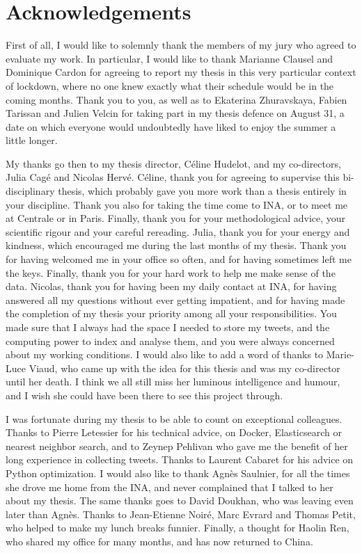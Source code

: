 \chapter*{Acknowledgements}

First of all, I would like to solemnly thank the members of my jury who agreed to evaluate my work. In particular, I would like to thank Marianne Clausel and Dominique Cardon for agreeing to report my thesis in this very particular context of lockdown, where no one knew exactly what their schedule would be in the coming months. Thank you to you, as well as to Ekaterina Zhuravskaya, Fabien Tarissan and Julien Velcin for taking part in my thesis defence on August 31, a date on which everyone would undoubtedly have liked to enjoy the summer a little longer.


My thanks go then to my thesis director, Céline Hudelot, and my co-directors, Julia Cagé and Nicolas Hervé. Céline, thank you for agreeing to supervise this bi-disciplinary thesis, which probably gave you more work than a thesis entirely in your discipline. Thank you also for taking the time come to INA, or to meet me at Centrale or in Paris. Finally, thank you for your methodological advice, your scientific rigour and your careful rereading. Julia, thank you for your energy and kindness, which encouraged me during the last months of my thesis. Thank you for having welcomed me in your office so often, and for having sometimes left me the keys. Finally, thank you for your hard work to help me make sense of the data. Nicolas, thank you for having been my daily contact at INA, for having answered all my questions without ever getting impatient, and for having made the completion of my thesis your priority among all your responsibilities. You made sure that I always had the space I needed to store my tweets, and the computing power to index and analyse them, and you were always concerned about my working conditions. I would also like to add a word of thanks to Marie-Luce Viaud, who came up with the idea for this thesis and was my co-director until her death. I think we all still miss her luminous intelligence and humour, and I wish she could have been there to see this project through.


I was fortunate during my thesis to be able to count on exceptional colleagues. Thanks to Pierre Letessier for his technical advice, on Docker, Elasticsearch or nearest neighbor search, and to Zeynep Pehlivan who gave me the benefit of her long experience in collecting tweets. Thanks to Laurent Cabaret for his advice on Python optimization. I would also like to thank Agnès Saulnier, for all the times she drove me home from the INA, and never complained that I talked to her about my thesis. The same thanks goes to David Doukhan, who was leaving even later than Agnès. Thanks to Jean-Etienne Noiré, Marc Evrard and Thomas Petit, who helped to make my lunch breaks funnier. Finally, a thought for Haolin Ren, who shared my office for many months, and has now returned to China.


